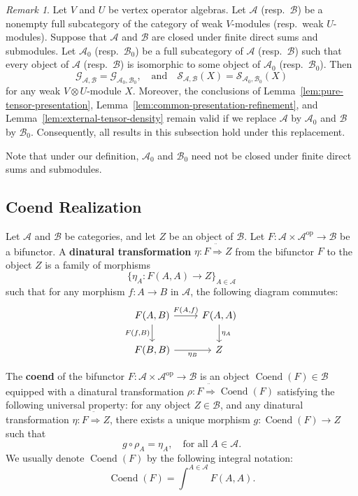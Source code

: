 \documentclass[12pt, english]{article}
\numberwithin{equation}{section}
\DeclareMathOperator{\opp}{op}
\DeclareMathOperator{\Coend}{Coend}
\theoremstyle{plain}
\theoremstyle{definition}
\theoremstyle{remark}
\newtheorem{remark}[lemma]{Remark}
\begin{document}
	\begin{remark}
		Let  $V$ and $U$ be vertex operator algebras.
		Let $\mathcal{A}$ (resp.\ $\mathcal{B}$) be a nonempty full subcategory of the category of weak $V$-modules (resp.\ weak $U$-modules).
		Suppose that $\mathcal{A}$ and $\mathcal{B}$ are closed under finite direct sums and submodules.
		Let $\mathcal{A}_0$ (resp.\ $\mathcal{B}_0$) be a full subcategory of $\mathcal{A}$ (resp.\ $\mathcal{B}$) such that every object of $\mathcal{A}$ (resp.\ $\mathcal{B}$) is isomorphic to some object of $\mathcal{A}_0$ (resp.\ $\mathcal{B}_0$).
		Then
		\[
		\mathcal{G}_{\mathcal{A}, \mathcal{B}} = \mathcal{G}_{\mathcal{A}_0, \mathcal{B}_0}, \quad \text{and} \quad
		\mathcal{S}_{\mathcal{A}, \mathcal{B}}(X) = \mathcal{S}_{\mathcal{A}_0, \mathcal{B}_0}(X)
		\]
		for any weak $V \otimes U$-module $X$.
		Moreover, the conclusions of Lemma~\ref{lem:pure-tensor-presentation}, Lemma~\ref{lem:common-presentation-refinement}, and Lemma~\ref{lem:external-tensor-density} remain valid if we replace $\mathcal{A}$ by $\mathcal{A}_0$ and $\mathcal{B}$ by $\mathcal{B}_0$. Consequently, all results in this subsection hold under this replacement.
		
		Note that under our definition, $\mathcal{A}_0$ and $\mathcal{B}_0$ need not be closed under finite direct sums and submodules.
		
	\end{remark}
	
	\subsection{ Coend Realization  } \label{Section-coend}
	
	Let $\mathcal{A}$ and $\mathcal{B}$ be categories, and let $Z$ be an object of $\mathcal{B}$.
	Let $F\colon\mathcal{A} \times\mathcal{A}^{\opp} \to \mathcal{B}$ be a bifunctor.
	A \textbf{ dinatural transformation} $\eta \colon F \ddot{ \Rightarrow } Z$ from the bifunctor $F$ to the object $Z$ is a family of morphisms
	\[
	\{\eta_{A}\colon F(A, A) \longrightarrow Z\}_{A \in \mathcal{A} }
	\]
	such that for any morphism $f\colon A \to B$ in $\mathcal{A}$, the following diagram commutes:
	\[
	\begin{tikzcd}
		{F(A, B)} \arrow[r, "{F(A, f)}"] \arrow[d, "{ F(f, B) }"'] & {F(A, A)} \arrow[d, "{\eta_A}"] \\
		{F(B, B)} \arrow[r, "{\eta_B}"'] & Z
	\end{tikzcd}
	\]
	
	The \textbf{ coend} of the bifunctor $F\colon\mathcal{A} \times\mathcal{A}^{\opp} \to \mathcal{B}$
	is an object $\Coend(F) \in \mathcal{B}$ equipped with a dinatural transformation
	$\rho \colon F \ddot{ \Rightarrow } \Coend(F)$ satisfying the following universal property: for any object $Z \in \mathcal{B}$,
	and any dinatural transformation $\eta \colon F \ddot{ \Rightarrow } Z$, there exists a unique morphism $g \colon \Coend(F) \to Z $
	such that
	\[
	g \circ \rho_A = \eta_A, \quad \text{for all} \; A \in \mathcal{A}.
	\]
	We usually denote $\Coend(F)$ by the following integral notation:
	\[
	\Coend(F) = \int^{A \in \mathcal A}F(A, A).
	\]
	
\end{document}

